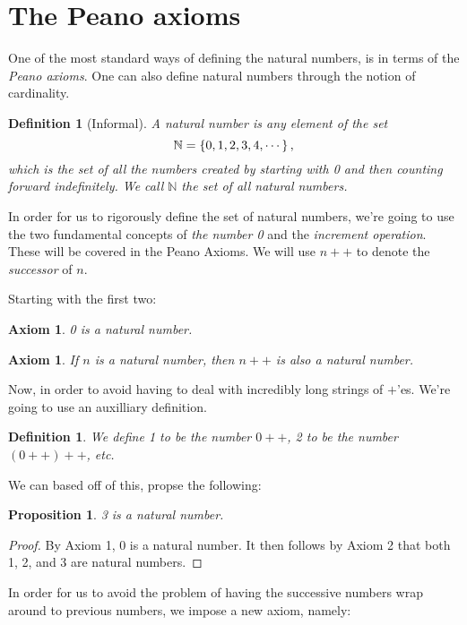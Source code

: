 \documentclass[a4paper, twocolumn]{report}
\newcounter{dummy} \numberwithin{dummy}{section}
\newcounter{axmcntr} \numberwithin{axmcntr}{chapter}
\newtheorem{defn}[dummy]{Definition}
\newtheorem{axm}[axmcntr]{Axiom}
\newtheorem{prp}[dummy]{Proposition}
\begin{document}
\section{The Peano axioms}
One of the most standard ways of defining the natural numbers, is in terms of
the \textit{Peano axioms}. One can also define natural numbers through the
notion of cardinality.

\begin{defn}[Informal]
  A \textit{natural number} is any element of the set
  \begin{equation}
    \notag
    \mathbb{N} = \left\{ 0, 1, 2, 3, 4, \cdots \right\},
  \end{equation}
  which is the set of all the numbers created by starting with 0 and then
  counting forward indefinitely. We call $\mathbb{N}$ the \textit{set of all
  natural numbers}.
\end{defn}

In order for us to rigorously define the set of natural numbers, we're going to
use the two fundamental concepts of \textit{the number 0} and the
\textit{increment operation}.  These will be covered in the Peano Axioms.
We will use $n++$ to denote the \textit{successor} of $n$. 

Starting with the first two: 
\begin{axm}
  0 is a natural number.
\end{axm}
\begin{axm}
  If $n$ is a natural number, then $n++$ is also a natural number.
\end{axm}

Now, in order to avoid having to deal with incredibly long strings of $+$'es.
We're going to use an auxilliary definition.
\begin{defn}
  We define 1 to be the number $0++$, 2 to be the number $(0++)++$, etc.
\end{defn}
We can based off of this, propse the following:

\begin{prp}
  3 is a natural number.
\end{prp}
\begin{proof}
  By Axiom 1, 0 is a natural number.
  It then follows by Axiom 2 that both 1, 2, and 3 are natural numbers.
\end{proof}

In order for us to avoid the problem of having the successive numbers wrap
around to previous numbers, we impose a new axiom, namely:
\end{document}
